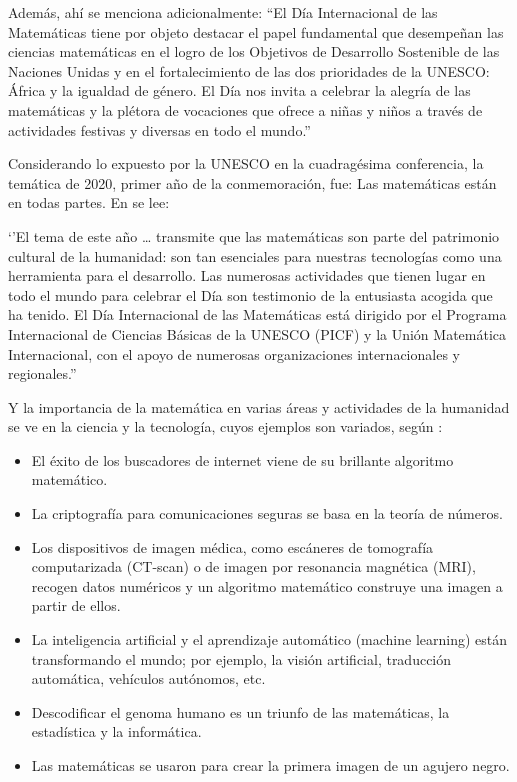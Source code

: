     Además, ahí se menciona adicionalmente: 
    “El Día Internacional de las Matemáticas tiene por objeto destacar el papel fundamental que desempeñan las ciencias matemáticas en el logro de los Objetivos de Desarrollo Sostenible de las Naciones Unidas y en el fortalecimiento de las dos prioridades de la UNESCO: África y la igualdad de género. El Día nos invita a celebrar la alegría de las matemáticas y la plétora de vocaciones que ofrece a niñas y niños a través de actividades festivas y diversas en todo el mundo.”
    
 Considerando lo expuesto por la UNESCO en la cuadragésima conferencia, la temática de 2020, primer año de la conmemoración, fue: Las matemáticas están en todas partes. En \cite{UNESCO2020IDM} se lee:
 
    ‘’El tema de este año … transmite que las matemáticas son parte del patrimonio cultural de la humanidad: son tan esenciales para nuestras tecnologías como una herramienta para el desarrollo. Las numerosas actividades que tienen lugar en todo el mundo para celebrar el Día son testimonio de la entusiasta acogida que ha tenido. El Día Internacional de las Matemáticas está dirigido por el Programa Internacional de Ciencias Básicas de la UNESCO (PICF) y la Unión Matemática Internacional, con el apoyo de numerosas organizaciones internacionales y regionales.”
    
Y la importancia de la matemática en varias áreas y actividades de la humanidad se ve en la ciencia y la tecnología, cuyos ejemplos son variados, según \cite{UNESCO2020IDM}:

\begin{itemize}

  \color{blue}  \item \color{black} El éxito de los buscadores de internet viene de su brillante algoritmo matemático.
    
   \color{blue} \item \color{black} La criptografía para comunicaciones seguras se basa en la teoría de números.   
    
    \color{blue} \item \color{black} Los dispositivos de imagen médica, como escáneres de tomografía computarizada (CT-scan) o de imagen por resonancia magnética (MRI), recogen datos numéricos y un algoritmo matemático construye una imagen a partir de ellos.   

    \color{blue} \item \color{black} La inteligencia artificial y el aprendizaje automático (machine learning) están transformando el mundo; por ejemplo, la visión artificial, traducción automática, vehículos autónomos, etc.
    
    \color{blue} \item \color{black} Descodificar el genoma humano es un triunfo de las matemáticas, la estadística y la informática.
    
    \color{blue} \item \color{black} Las matemáticas se usaron para crear la primera imagen de un agujero negro.
    
    \end{itemize}
    
